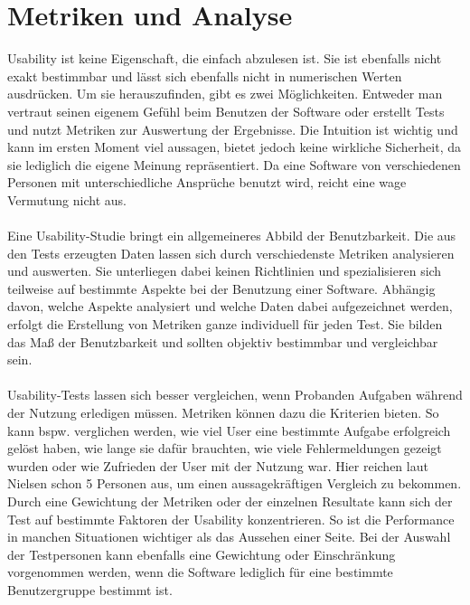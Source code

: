 %
%
%
%


\section{Metriken und Analyse}
\label{metrics}

Usability ist keine Eigenschaft, die einfach abzulesen ist. Sie ist ebenfalls nicht exakt bestimmbar und lässt sich ebenfalls nicht in numerischen Werten ausdrücken. Um sie herauszufinden, gibt es zwei Möglichkeiten. Entweder man vertraut seinen eigenem Gefühl beim Benutzen der Software oder erstellt Tests und nutzt Metriken zur Auswertung der Ergebnisse. Die Intuition ist wichtig und kann im ersten Moment viel aussagen, bietet jedoch keine wirkliche Sicherheit, da sie lediglich die eigene Meinung repräsentiert. Da eine Software von verschiedenen Personen mit unterschiedliche Ansprüche benutzt wird, reicht eine wage Vermutung nicht aus.\\
\\
Eine Usability-Studie bringt ein allgemeineres Abbild der Benutzbarkeit. Die aus den Tests erzeugten Daten lassen sich durch verschiedenste Metriken analysieren und auswerten. Sie unterliegen dabei keinen Richtlinien und spezialisieren sich teilweise auf bestimmte Aspekte bei der Benutzung einer Software. Abhängig davon, welche Aspekte analysiert und welche Daten dabei aufgezeichnet werden, erfolgt die Erstellung von Metriken ganze individuell für jeden Test. Sie bilden das Maß der Benutzbarkeit und sollten objektiv bestimmbar und vergleichbar sein.\\
\\
Usability-Tests lassen sich besser vergleichen, wenn Probanden Aufgaben während der Nutzung erledigen müssen. Metriken können dazu die Kriterien bieten. So kann bspw. verglichen werden, wie viel User eine bestimmte Aufgabe erfolgreich gelöst haben, wie lange sie dafür brauchten, wie viele Fehlermeldungen gezeigt wurden oder wie Zufrieden der User mit der Nutzung war. Hier reichen laut Nielsen \cite{metrics} schon 5 Personen aus, um einen aussagekräftigen Vergleich zu bekommen. Durch eine Gewichtung der Metriken oder der einzelnen Resultate kann sich der Test auf bestimmte Faktoren der Usability konzentrieren. So ist die Performance in manchen Situationen wichtiger als das Aussehen einer Seite. Bei der Auswahl der Testpersonen kann ebenfalls eine Gewichtung oder Einschränkung vorgenommen werden, wenn die Software lediglich für eine bestimmte Benutzergruppe bestimmt ist.\\
